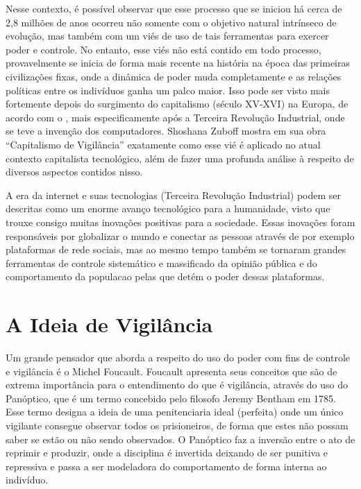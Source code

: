 \documentclass[
	12pt,
	openright,
	twoside,
	a4paper,
	english,
	french,
	spanish,
	brazil
]{abntex2}
\begin{document}
  Nesse contexto, é possível observar que esse processo que se iniciou há cerca
  de 2,8 milhões de anos ocorreu não somente com o objetivo natural intrínseco
  de evolução, mas também com um viés de uso de tais ferramentas para exercer
  poder e controle. No entanto, esse viés não está contido em todo processo,
  provavelmente se inicia de forma mais recente na história na época das
  primeiras civilizações fixas, onde a dinâmica de poder muda completamente e as
  relações políticas entre os indivíduos ganha um palco maior. Isso pode ser
  visto mais fortemente depois do surgimento do capitalismo (século XV-XVI) na
  Europa, de acordo com o , mais especificamente
  após a Terceira Revolução Industrial, onde se teve a invenção dos
  computadores. Shoshana Zuboff mostra em sua obra ``Capitalismo de Vigilância''
  exatamente como esse vié é aplicado no atual contexto capitalista tecnológico,
  além de fazer uma profunda análise à respeito de diversos aspectos contidos
  nisso.

  A era da internet e suas tecnologias (Terceira Revolução Industrial) podem ser
  descritas como um enorme avanço tecnológico para a humanidade, visto que
  trouxe consigo muitas inovações positivas para a sociedade. Essas inovações
  foram responsáveis por globalizar o mundo e conectar as pessoas através de por
  exemplo plataformas de rede sociais, mas ao mesmo tempo também se tornaram
  grandes ferramentas de controle sistemático e massificado da opinião pública e
  do comportamento da populacao pelas que detém o poder dessas plataformas.

  \chapter{A Ideia de Vigilância}

  Um grande pensador que aborda a respeito do uso do poder com fins de controle
  e vigilância é o Michel Foucault. Foucault apresenta seus conceitos que são de
  extrema importância para o entendimento do que é vigilância, através do uso do
  Panóptico, que é um termo concebido pelo filosofo Jeremy Bentham em 1785. Esse
  termo designa a ideia de uma penitenciaria ideal (perfeita) onde um único
  vigilante consegue observar todos os prisioneiros, de forma que estes não
  possam saber se estão ou não sendo observados. O Panóptico faz a inversão
  entre o ato de reprimir e produzir, onde a disciplina é invertida deixando de
  ser punitiva e repressiva e passa a ser modeladora do comportamento de forma
  interna ao indivíduo.


  \postextual

  
\end{document}
